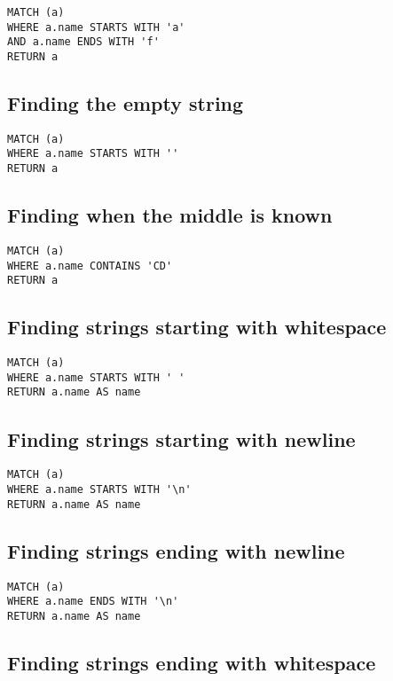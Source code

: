 \begin{lstlisting}
MATCH (a)
WHERE a.name STARTS WITH 'a'
AND a.name ENDS WITH 'f'
RETURN a
\end{lstlisting}

\subsection{Finding the empty string}

\begin{lstlisting}
MATCH (a)
WHERE a.name STARTS WITH ''
RETURN a
\end{lstlisting}

\subsection{Finding when the middle is known}

\begin{lstlisting}
MATCH (a)
WHERE a.name CONTAINS 'CD'
RETURN a
\end{lstlisting}

\subsection{Finding strings starting with whitespace}

\begin{lstlisting}
MATCH (a)
WHERE a.name STARTS WITH ' '
RETURN a.name AS name
\end{lstlisting}

\subsection{Finding strings starting with newline}

\begin{lstlisting}
MATCH (a)
WHERE a.name STARTS WITH '\n'
RETURN a.name AS name
\end{lstlisting}

\subsection{Finding strings ending with newline}

\begin{lstlisting}
MATCH (a)
WHERE a.name ENDS WITH '\n'
RETURN a.name AS name
\end{lstlisting}

\subsection{Finding strings ending with whitespace}

